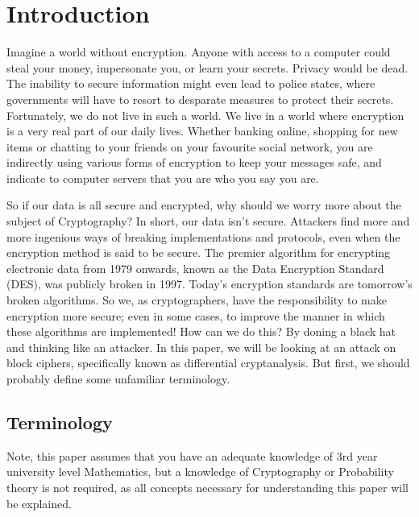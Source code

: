 



\chapter{Introduction} \label{c:introduction}
Imagine a world without encryption. Anyone with access to a computer could
steal your money, impersonate you, or learn your secrets.  Privacy would be
dead. The inability to secure information might even lead to police states,
where governments will have to resort to desparate measures to protect their
secrets.  Fortunately, we do not live in such a world. We live in a world where
encryption is a very real part of our daily lives. Whether banking online,
shopping for new items or chatting to your friends on your favourite social
network, you are indirectly using various forms of encryption to keep your
messages safe, and indicate to computer servers that you are who you say you
are.

So if our data is all secure and encrypted, why should we worry more about the
subject of Cryptography? In short, our data isn't secure. Attackers find more
and more ingenious ways of breaking implementations and protocols, even when
the encryption method is said to be secure. The premier algorithm for
encrypting electronic data from 1979 onwards, known as the Data Encryption
Standard (DES), was publicly broken in 1997. Today's encryption standards are
tomorrow's broken algorithms. So we, as cryptographers, have the responsibility
to make encryption more secure; even in some cases, to improve the manner in
which these algorithms are implemented!  How can we do this? By doning a black
hat and thinking like an attacker. In this paper, we will be looking at an
attack on block ciphers, specifically known as differential cryptanalysis. But
first, we should probably define some unfamiliar terminology.

\section{Terminology}

\begin{rem}
Note, this paper assumes that you have an adequate knowledge of 3rd year
university level Mathematics, but a knowledge of Cryptography or Probability
theory is not required, as all concepts necessary for understanding this paper
will be explained.
\end{rem}

